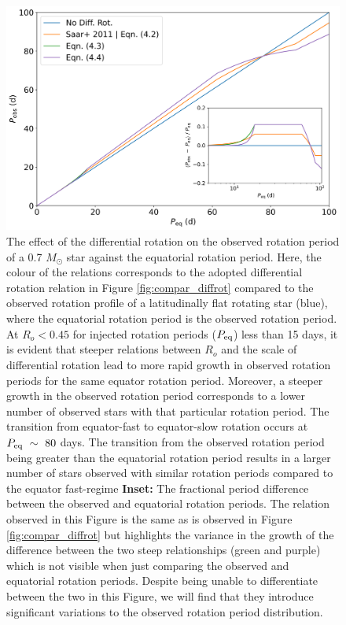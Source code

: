\begin{figure}
\centering
 \includegraphics[width=\textwidth]{Figures/rot_gap_figures/comparison_observed_rot_periods.png}
 \caption[The effect of the differential rotation on the observed rotation period of a 0.7 $M_{\odot}$ against equatorial rotation period.]{
 	The effect of the differential rotation on the observed rotation period of a 0.7 $M_{\odot}$ star against the equatorial rotation period. Here, the colour of the relations corresponds to the adopted differential rotation relation in Figure \ref{fig:compar_diffrot} compared to the observed rotation profile of a latitudinally flat rotating star (blue), where the equatorial rotation period is the observed rotation period. At $R_o<0.45$ for injected rotation periods ($P_{\rm{eq}}$) less than 15 days, it is evident that steeper relations between $R_o$ and the scale of differential rotation lead to more rapid growth in observed rotation periods for the same equator rotation period. Moreover, a steeper growth in the observed rotation period corresponds to a lower number of observed stars with that particular rotation period. The transition from equator-fast to equator-slow rotation occurs at $P_{\rm{eq}} \ \sim \ 80$ days. The transition from the observed rotation period being greater than the equatorial rotation period results in a larger number of stars observed with similar rotation periods compared to the equator fast-regime \textbf{Inset:} The fractional period difference between the observed and equatorial rotation periods. The relation observed in this Figure is the same as is observed in Figure \ref{fig:compar_diffrot} but highlights the variance in the growth of the difference between the two steep relationships (green and purple) which is not visible when just comparing the observed and equatorial rotation periods. Despite being unable to differentiate between the two in this Figure, we will find that they introduce significant variations to the observed rotation period distribution.}
 \label{fig:comp_per}
\end{figure}


